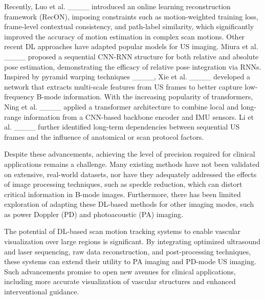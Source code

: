 Recently, Luo et al. ____ 
introduced an online learning reconstruction framework (RecON), 
imposing constraints such as motion-weighted training loss, frame-level contextual consistency, 
and path-label similarity, which significantly improved the accuracy of motion estimation 
in complex scan motions. 
Other recent DL approaches have adapted popular models for US imaging. 
Miura et al. ____ proposed a sequential CNN-RNN structure 
for both relative and absolute pose estimation, 
demonstrating the efficacy of relative pose integration via RNNs. 
Inspired by pyramid warping techniques ____, 
Xie et al. ____ developed a network 
that extracts multi-scale features from US frames 
to better capture low-frequency B-mode information. 
With the increasing popularity of transformers, 
Ning et al. ____ applied a transformer architecture 
to combine local and long-range information from a CNN-based backbone encoder and IMU sensors. 
Li et al. ____ further identified long-term dependencies 
between sequential US frames and the influence of anatomical or scan protocol factors.

Despite these advancements, achieving the level of precision required for clinical applications remains a challenge. Many existing methods have not been validated on extensive, real-world datasets, nor have they adequately addressed the effects of image processing techniques, such as speckle reduction, which can distort critical information in B-mode images. Furthermore, there has been limited exploration of adapting these DL-based methods for other imaging modes, such as power Doppler (PD) and photoacoustic (PA) imaging.

The potential of DL-based scan motion tracking systems to enable vascular visualization over large regions is significant. By integrating optimized ultrasound and laser sequencing, raw data reconstruction, and post-processing techniques, these systems can extend their utility to PA imaging and PD-mode US imaging. Such advancements promise to open new avenues for clinical applications, including more accurate visualization of vascular structures and enhanced interventional guidance.